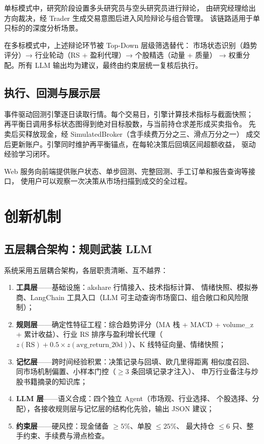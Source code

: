 \documentclass[a4paper,11pt]{article}
\begin{document}
单标模式中，研究阶段设置多头研究员与空头研究员进行辩论，
由研究经理给出方向裁决，经 Trader 生成交易意图后进入风险辩论与组合管理。
该链路适用于单只标的的深度分析场景。

在多标模式中，上述辩论环节被 Top-Down 层级筛选替代：
市场状态识别（趋势评分）→ 行业轮动（RS + 盈利代理）→ 个股精选（动量 + 质量）
→ 权重分配。所有 LLM 输出均为建议，最终由约束层统一复核后执行。

\subsection{执行、回测与展示层}

事件驱动回测引擎逐日读取行情。每个交易日，引擎计算技术指标与截面快照；
再平衡日调用多标状态图得到绝对目标股数，与当前持仓求差形成买卖指令。
先卖后买释放现金，经 SimulatedBroker（含手续费万分之三、滑点万分之一）
成交后更新账户。引擎同时维护再平衡锚点，在每轮决策后回填区间超额收益，
驱动经验学习闭环。

Web 服务向前端提供账户状态、单步回测、完整回测、手工订单和报告查询等接口，
使用户可以观察一次决策从市场扫描到成交的全过程。

\section{创新机制}

\subsection{五层耦合架构：规则武装 LLM}

系统采用五层耦合架构，各层职责清晰、互不越界：

\begin{enumerate}
    \item \textbf{工具层}——基础设施：akshare 行情接入、技术指标计算、
    情绪快照、模拟券商、LangChain 工具入口（LLM 可主动查询市场窗口、组合敞口和风险限制）；
    \item \textbf{规则层}——确定性特征工程：综合趋势评分（MA 栈 + MACD +
    volume\_z + 累计收益）、行业 RS 排序与盈利增长代理（$z(\mathrm{RS}) +
    0.5 \times z(\mathrm{avg\_return\_20d})$）、K 线特征向量、情绪快照；
    \item \textbf{记忆层}——跨时间经验积累：决策记录与回填、欧几里得距离
    相似度召回、同市场机制偏置、小样本门控（$\geq 3$ 条回填记录才注入）、
    申万行业备注与炒股书籍摘录的知识库；
    \item \textbf{LLM 层}——语义合成：四个独立 Agent（市场观、行业选择、
    个股选择、分配），各接收规则层与记忆层的结构化先验，输出 JSON 建议；
    \item \textbf{约束层}——硬风控：现金储备 $\geq 5\%$、单股 $\leq 25\%$、
    最大持仓 $\leq 6$ 只、整手约束、手续费与滑点检查。
\end{enumerate}
\end{document}

